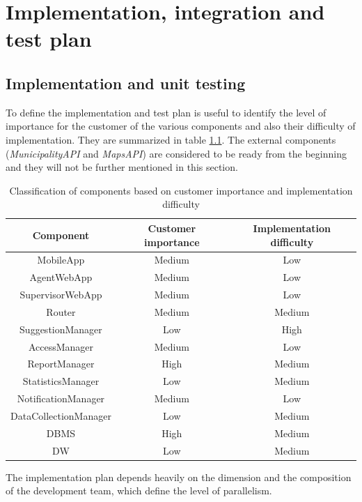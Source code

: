\documentclass[a4paper]{report}
\begin{document}
\chapter{Implementation, integration and test plan}
\section{Implementation and unit testing}
To define the implementation and test plan is useful to identify the level of importance for the customer of the various components and also their difficulty of implementation. They are summarized in table \ref{tab-testing}. The external components (\textit{MunicipalityAPI} and \textit{MapsAPI}) are considered to be ready from the beginning and they will not be further mentioned in this section.\\
\begin{table}[H]  
  \centering
  \bgroup
  \def\arraystretch{1.5}%
  \begin{tabular}{|c|c|c|}
    \cline{1-3}
    \textbf{Component} & \textbf{Customer importance} & \textbf{Implementation difficulty} \\ \hline
    MobileApp & Medium & Low   \\ \hline
    AgentWebApp & Medium & Low   \\ \hline
    SupervisorWebApp & Medium & Low   \\ \hline
    Router & Medium & Medium   \\ \hline
    SuggestionManager & Low & High   \\ \hline
    AccessManager & Medium & Low   \\ \hline
    ReportManager & High & Medium   \\ \hline
    StatisticsManager & Low & Medium   \\ \hline
    NotificationManager & Medium & Low   \\ \hline
    DataCollectionManager & Low & Medium   \\ \hline
    DBMS & High & Medium   \\ \hline
    DW & Low & Medium   \\ \hline
    
  \end{tabular}
  \egroup
  \caption{Classification of components based on customer importance and implementation difficulty}
  \label{tab-testing}
\end{table}
The implementation plan depends heavily on the dimension and the composition of the development team, which define the level of parallelism.
\end{document}
